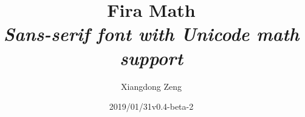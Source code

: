 \documentclass{article}
\title{\bfseries\huge Fira Math\\
  \itshape\Large Sans-serif font with Unicode math support}
\author{Xiangdong Zeng}
\date{2019/01/31\quad v0.4-beta-2}
\begin{document}
\maketitle
\printtable
\end{document}
